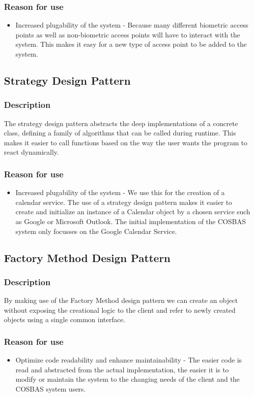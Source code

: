 	\subsubsection{Reason for use}
	\begin{itemize}
		\item{Increased plugability of the system} - Because many different biometric access points as well as non-biometric access points will have to interact with the system. This makes it easy for a new type of access point to be added to the system.
	\end{itemize}
	
\subsection{Strategy Design Pattern}
	\subsubsection{Description}
	The strategy design pattern abstracts the deep implementations of a concrete class, defining a family of algorithms that can be called during runtime. This makes it easier to call functions based on the way the user wants the program to react dynamically.
	
	
	\subsubsection{Reason for use}
	\begin{itemize}
		\item{Increased plugability of the system} - We use this for the creation of a calendar service. The use of a strategy design pattern makes it easier to create and initialize an instance of a Calendar object by a chosen service such as Google or Microsoft Outlook. The initial implementation of the COSBAS system only focusses on the Google Calendar Service.
	\end{itemize}
	
\subsection{Factory Method Design Pattern}
	\subsubsection{Description}
	By making use of the Factory Method design pattern we can create an object without exposing the creational logic to the client and refer to newly created objects using a single common interface.
	
	\subsubsection{Reason for use}
	\begin{itemize}
		\item{Optimize code readability and enhance maintainability} - The easier code is read and abstracted from the actual implementation, the easier it is to modify or maintain the system to the changing needs of the client and the COSBAS system users. 
	\end{itemize}